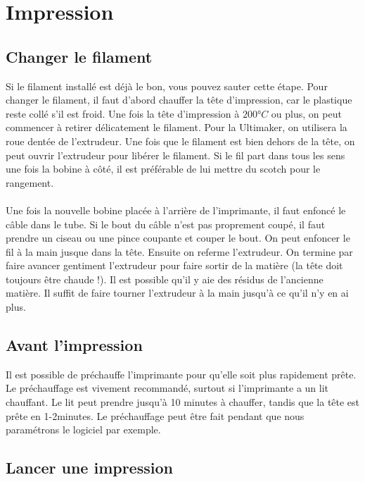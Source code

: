 
\section{Impression}

\subsection{Changer le filament}

Si le filament installé est déjà le bon, vous pouvez sauter cette étape. Pour changer le filament, il faut d'abord chauffer la tête d'impression, car le plastique reste collé s'il est froid. Une fois la tête d'impression à $200°C$ ou plus, on peut commencer à retirer délicatement le filament. Pour la Ultimaker, on utilisera la roue dentée de l'extrudeur. Une fois que le filament est bien dehors de la tête, on peut ouvrir l'extrudeur pour libérer le filament. Si le fil part dans tous les sens une fois la bobine à côté, il est préférable de lui mettre du scotch pour le rangement.

\paragraph{} Une fois la nouvelle bobine placée à l'arrière de l'imprimante, il faut enfoncé le câble dans le tube. Si le bout du câble n'est pas proprement coupé, il faut prendre un ciseau ou une pince coupante et couper le bout. On peut enfoncer le fil à la main jusque dans la tête. Ensuite on referme l'extrudeur. On termine par faire avancer gentiment l'extrudeur pour faire sortir de la matière (la tête doit toujours être chaude !). Il est possible qu'il y aie des résidus de l'ancienne matière. Il suffit de faire tourner l'extrudeur à la main jusqu'à ce qu'il n'y en ai plus.

\subsection{Avant l'impression}

Il est possible de préchauffe l'imprimante pour qu'elle soit plus rapidement prête. Le préchauffage est vivement recommandé, surtout si l'imprimante a un lit chauffant. Le lit peut prendre jusqu'à 10 minutes à chauffer, tandis que la tête est prête en 1-2minutes. Le préchauffage peut être fait pendant que nous paramétrons le logiciel par exemple.

 \subsection{Lancer une impression}

